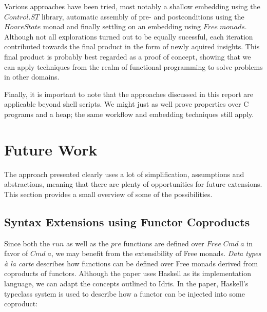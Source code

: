\documentclass[12pt,a4paper]{article}
\newcommand{\Conid}[1]{\mathit{#1}}
\newcommand{\Varid}[1]{\mathit{#1}}
\begin{document}
 Various approaches have been tried, most notably a shallow embedding using the \ensuremath{\Conid{\Conid{Control}.ST}} library, automatic assembly of pre- and postconditions using the \ensuremath{\Conid{HoareState}} monad and finally settling on an embedding using \ensuremath{\Conid{Free}\;\Varid{monads}}. Although not all explorations turned out to be equally sucessful, each iteration contributed towards the final product in the form of newly aquired insights. This final product is probably best regarded as a proof of concept, showing that we can apply techniques from the realm of functional programming to solve problems in other domains. 

 Finally, it is important to note that the approaches discussed in this report are applicable beyond shell scripts. We might just as well prove properties over C programs and a heap; the same workflow and embedding techniques still apply.

\section{Future Work}

The approach presented clearly uses a lot of simplification, assumptions and abstractions, meaning that there are plenty of opportunities for future extensions. This section provides a small overview of some of the possibilities. 

\subsection{Syntax Extensions using Functor Coproducts}

Since both the \ensuremath{\Varid{run}} as well as the \ensuremath{\Varid{pre}} functions are defined over \ensuremath{\Conid{Free}\;\Conid{Cmd}\;\Varid{a}} in favor of \ensuremath{\Conid{Cmd}\;\Varid{a}}, we may benefit from the extensibility of Free monads. \textit{Data types à la carte} \cite{swierstra08} describes how functions can be defined over Free monads derived from coproducts of functors. Although the paper uses Haskell as its implementation language, we can adapt the concepts outlined to Idris. In the paper, Haskell's typeclass system is used to describe how a functor can be injected into some coproduct: 
\end{document}

